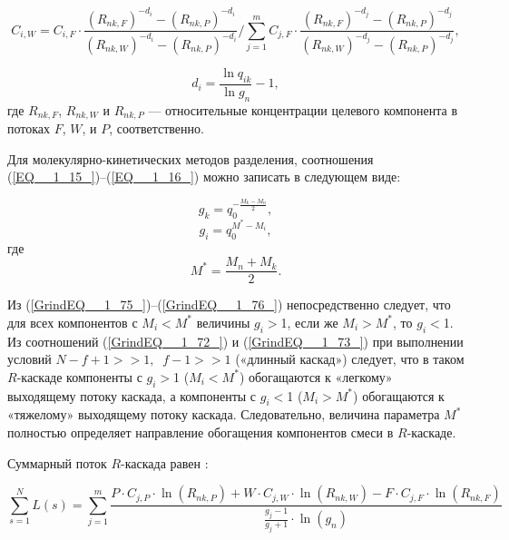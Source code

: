 \begin{equation} \label{GrindEQ__1_73_} 
  C_{i,W}=C_{i,F} \cdot \frac{\left(R_{n k,F}\right)^{-d_{i}}-\left(R_{n k,P}\right)^{-d_{i}}}{\left(R_{n k,W}\right)^{-d_{i}}-\left(R_{n k,P}\right)^{-d_{i}}} / \sum_{j=1}^{m} C_{j,F} \cdot \frac{\left(R_{n k,F}\right)^{-d_{j}}-\left(R_{n k,P}\right)^{-d_{j}}}{\left(R_{n k,W}\right)^{-d_{j}}-\left(R_{n k,P}\right)^{-d_{j}}},
\end{equation} 

\begin{equation} \label{GrindEQ__1_74_} 
  d_{i} =\frac{\ln q_{ik} }{\ln g_{n} } -1,              
\end{equation}
где $R_{n k,F}$, $R_{n k,W}$ и $R_{n k,P}$ --- относительные концентрации целевого компонента в потоках $F$, $W$, и $P$, соответственно.


Для молекулярно-кинетических методов разделения, соотношения (\ref{EQ__1_15_})--(\ref{EQ__1_16_}) можно записать в следующем виде:

\begin{equation} \label{GrindEQ__1_75_} 
  g_{k} =q_{0}^{-\frac{M_{k} -M_{n} }{2} } ,        
\end{equation} 
\begin{equation} \label{GrindEQ__1_76_} 
  g_{i} =q_{0}^{M^{*} -M_{i} } ,        
\end{equation} 
где 
\begin{equation} \label{EQ_Mstar} 
  M^{*} =\frac{M_{n} +M_{k} }{2}.    
\end{equation} 

Из (\ref{GrindEQ__1_75_})--(\ref{GrindEQ__1_76_}) непосредственно следует, что для всех компонентов с $M_{i} $$\mathrm{<}$$M^{*} $ величины $g_{i} $$\mathrm{>}$1, если же $M_{i} $$\mathrm{>}$$M^{*} $, то $g_{i} $$\mathrm{<}$1. Из соотношений (\ref{GrindEQ__1_72_}) и (\ref{GrindEQ__1_73_}) при выполнении условий $N-f+1>>1,\; \; f-1>>1$ («длинный каскад») следует, что в таком $R$-каскаде компоненты с $g_{i} $$\mathrm{>}$1 ($M_{i} $$\mathrm{<}$$M^{*}$) обогащаются к «легкому» выходящему потоку каскада, а компоненты с $g_{i} $$\mathrm{<}$1 ($M_{i} $$\mathrm{>}$$M^{*}$) обогащаются к «тяжелому» выходящему потоку каскада. Следовательно, величина параметра $M^{*}$ полностью определяет направление обогащения компонентов смеси в $R$-каскаде. 

Суммарный поток $R$-каскада равен \cite{sulaberidzeTeoriyaKaskadovDlya2011}:

\begin{equation} \label{GrindEQ__1_77_} 
  \sum _{s=1}^{N}L(s) =\sum _{j=1}^{m}\frac{P \cdot C_{j,P} \cdot \ln(R_{nk,P}) +W \cdot C_{j,W} \cdot \ln(R_{nk,W}) -F \cdot C_{j,F} \cdot \ln(R_{nk,F})}{\frac{g_{j} -1}{g_{j} +1} \cdot \ln(g_{n})}              
\end{equation} 

